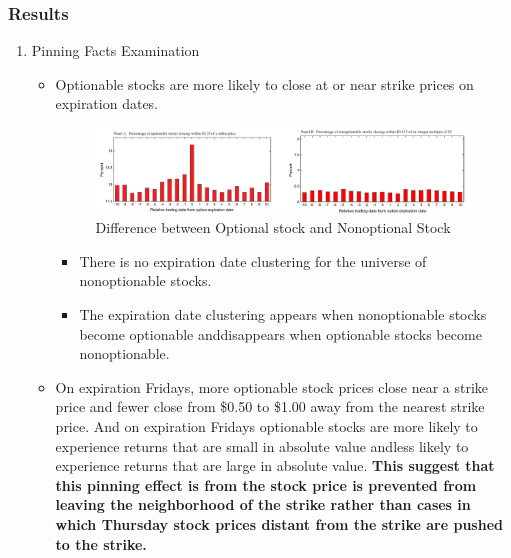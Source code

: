 \documentclass[10pt]{report}
\begin{document}
\subsubsection{Results}
\begin{enumerate}
\item Pinning Facts Examination
\begin{itemize}
    \item Optionable stocks are more likely to close at or near strike prices on expiration dates.
    \begin{figure}[!h]
        \centering
        \includegraphics[width=1\linewidth]{p3.png}
        \caption{Difference between Optional stock and Nonoptional Stock}
    \end{figure}
    \begin{itemize}
        \item There is no expiration date clustering for the universe of nonoptionable stocks.
        \item The expiration date clustering appears when nonoptionable stocks become optionable anddisappears when optionable stocks become nonoptionable.
    \end{itemize}
    \item On expiration Fridays, more optionable stock prices close near a strike price and fewer close from \$0.50 to \$1.00 away from the nearest strike price. And on expiration Fridays optionable stocks are more likely to experience returns that are small in absolute value andless likely to experience returns that are large in absolute value. \textbf{This suggest that this pinning effect is from the stock price is prevented from leaving the neighborhood of the strike rather than cases in which Thursday stock prices distant from the strike are pushed to the strike.}
    \begin{figure}[!h]


\end{figure}
\end{itemize}
\end{enumerate}
\end{document}
